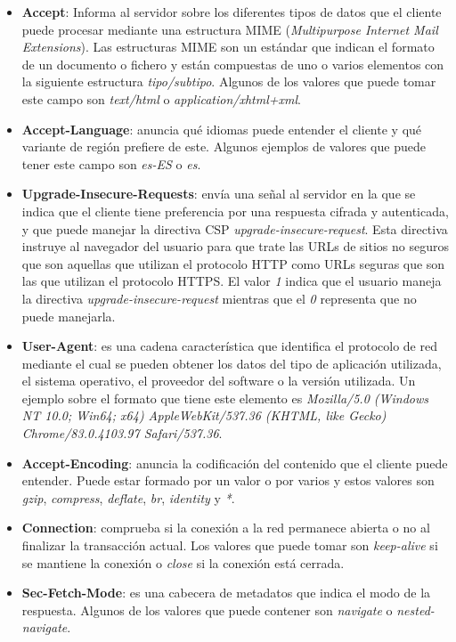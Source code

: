 \begin{itemize}
    \item \textbf{Accept}: Informa al servidor sobre los diferentes tipos de datos que el cliente puede procesar mediante una estructura MIME (\textit{Multipurpose Internet Mail Extensions}). Las estructuras MIME son un estándar que indican el formato de un documento o fichero y están compuestas de uno o varios elementos con la siguiente estructura \textit{tipo/subtipo}. Algunos de los valores que puede tomar este campo son \textit{text/html} o \textit{application/xhtml+xml}.
    \item \textbf{Accept-Language}: anuncia qué idiomas puede entender el cliente y qué variante de región prefiere de este. Algunos ejemplos de valores que puede tener este campo son \textit{es-ES} o \textit{es}.
    \item \textbf{Upgrade-Insecure-Requests}: envía una señal al servidor en la que se indica que el cliente tiene preferencia por una respuesta cifrada y autenticada, y que puede manejar la directiva CSP \textit{upgrade-insecure-request}. Esta directiva instruye al navegador del usuario para que trate las URLs de sitios no seguros que son aquellas que utilizan el protocolo HTTP como URLs seguras que son las que utilizan el protocolo HTTPS. El valor \textit{1} indica que el usuario maneja la directiva \textit{upgrade-insecure-request} mientras que el \textit{0} representa que no puede manejarla.
    \item \textbf{User-Agent}: es una cadena característica que identifica el protocolo de red mediante el cual se pueden obtener los datos del tipo de aplicación utilizada, el sistema operativo, el proveedor del software o la versión utilizada. Un ejemplo sobre el formato que tiene este elemento es \textit{Mozilla/5.0 (Windows NT 10.0; Win64; x64) AppleWebKit/537.36 (KHTML, like Gecko) Chrome/83.0.4103.97 Safari/537.36}. 
    \item \textbf{Accept-Encoding}: anuncia la codificación del contenido que el cliente puede entender. Puede estar formado por un valor o por varios y estos valores son \textit{gzip}, \textit{compress}, \textit{deflate}, \textit{br}, \textit{identity} y \textit{*}.
    \item \textbf{Connection}: comprueba si la conexión a la red permanece abierta o no al finalizar la transacción actual. Los valores que puede tomar son \textit{keep-alive} si se mantiene la conexión o \textit{close} si la conexión está cerrada.
    \item \textbf{Sec-Fetch-Mode}: es una cabecera de metadatos que indica el modo de la respuesta. Algunos de los valores que puede contener son \textit{navigate} o \textit{nested-navigate}.

\end{itemize}
